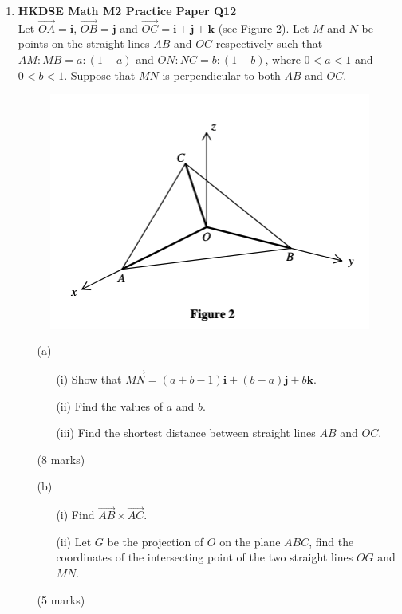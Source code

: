 \documentclass[12pt]{article}
\begin{document}
\begin{enumerate}
	\item \textbf{HKDSE Math M2 Practice Paper Q12}\\
	Let $\overrightarrow{OA} = \textbf{i}$, $\overrightarrow{OB} = \textbf{j}$ and $\overrightarrow{OC} = \textbf{i} + \textbf{j} + \textbf{k}$ (see Figure 2). Let $M$ and $N$ be points on the straight lines $AB$ and $OC$ respectively such that $AM:MB = a:(1-a)$ and $ON:NC = b:(1-b)$, where $0 < a < 1$ and $0 < b < 1$. Suppose that $MN$ is perpendicular to both $AB$ and $OC$.
	\begin{figure}[H]
		\centering
		\includegraphics[width = .5\linewidth]{PPFigure2}
	\end{figure}
	\begin{enumerate}
		\item [(a)]
		\begin{enumerate}
			\item [(i)]Show that $\overrightarrow{MN} = (a+b-1)\textbf{i} +(b-a) \textbf{j} +b \textbf{k}$. 
			\item [(ii)]Find the values of $a$ and $b$.
			\item [(iii)]Find the shortest distance between straight lines $AB$ and $OC$.
		\end{enumerate}
		(8 marks)
		\item [(b)]
		\begin{enumerate}
			\item [(i)]Find $\overrightarrow{AB}\times\overrightarrow{AC}$. 
			\item [(ii)]Let $G$ be the projection of $O$ on the plane $ABC$, find the coordinates of the intersecting point of the two straight lines $OG$ and $MN$.
		\end{enumerate}
		(5 marks)
  	\end{enumerate}


\end{enumerate}
\end{document}
